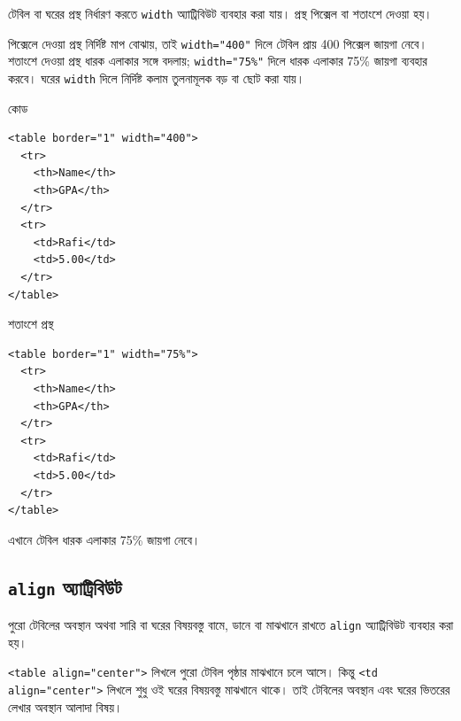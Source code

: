 টেবিল বা ঘরের প্রস্থ নির্ধারণ করতে \texttt{width} অ্যাট্রিবিউট ব্যবহার করা যায়। প্রস্থ পিক্সেল বা শতাংশে দেওয়া হয়।

পিক্সেলে দেওয়া প্রস্থ নির্দিষ্ট মাপ বোঝায়, তাই \texttt{width="400"} দিলে টেবিল প্রায় 400 পিক্সেল জায়গা নেবে। শতাংশে দেওয়া প্রস্থ ধারক এলাকার সঙ্গে বদলায়; \texttt{width="75\%"} দিলে ধারক এলাকার 75\% জায়গা ব্যবহার করবে। ঘরের \texttt{width} দিলে নির্দিষ্ট কলাম তুলনামূলক বড় বা ছোট করা যায়।

\par\noindent
\begin{minipage}[t]{.48\linewidth}\vspace{0pt}\small
\begin{chFourWholeExample}{কোড}
\begin{verbatim}
<table border="1" width="400">
  <tr>
    <th>Name</th>
    <th>GPA</th>
  </tr>
  <tr>
    <td>Rafi</td>
    <td>5.00</td>
  </tr>
</table>
\end{verbatim}
\end{chFourWholeExample}
\end{minipage}\hfill
\begin{minipage}[t]{.48\linewidth}\vspace{0pt}\small
\begin{chFourWholeExample}{শতাংশে প্রস্থ}
\begin{verbatim}
<table border="1" width="75%">
  <tr>
    <th>Name</th>
    <th>GPA</th>
  </tr>
  <tr>
    <td>Rafi</td>
    <td>5.00</td>
  </tr>
</table>
\end{verbatim}
এখানে টেবিল ধারক এলাকার 75\% জায়গা নেবে।
\end{chFourWholeExample}
\end{minipage}\par\smallskip

\subsection{\texttt{align} অ্যাট্রিবিউট}

পুরো টেবিলের অবস্থান অথবা সারি বা ঘরের বিষয়বস্তু বামে, ডানে বা মাঝখানে রাখতে \texttt{align} অ্যাট্রিবিউট ব্যবহার করা হয়।

\texttt{<table align="center">} লিখলে পুরো টেবিল পৃষ্ঠার মাঝখানে চলে আসে। কিন্তু \texttt{<td align="center">} লিখলে শুধু ওই ঘরের বিষয়বস্তু মাঝখানে থাকে। তাই টেবিলের অবস্থান এবং ঘরের ভিতরের লেখার অবস্থান আলাদা বিষয়।

